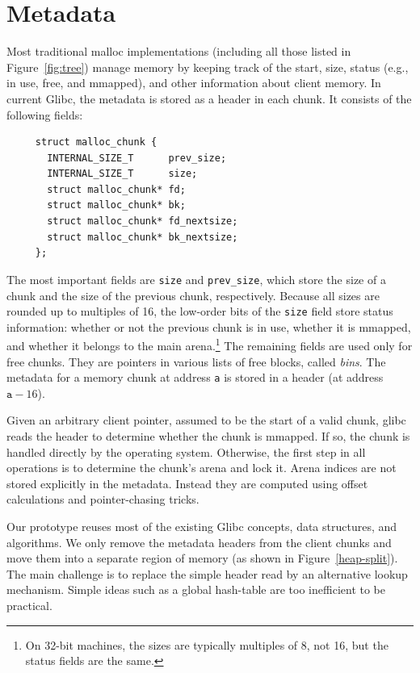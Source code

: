 \documentclass[12pt]{cslreport}
\begin{document}
\section{Metadata}

Most traditional malloc implementations (including all those listed in
Figure~\ref{fig:tree}) manage memory by keeping track of the start,
size, status (e.g., in use, free, and mmapped), and other information
about client memory. In current Glibc, the metadata is stored as a header
in each chunk. It consists of the following fields:
\begin{small}
\begin{verbatim}
     struct malloc_chunk {  
       INTERNAL_SIZE_T      prev_size; 
       INTERNAL_SIZE_T      size;
       struct malloc_chunk* fd;
       struct malloc_chunk* bk;
       struct malloc_chunk* fd_nextsize;
       struct malloc_chunk* bk_nextsize;
     };
\end{verbatim}
\end{small}
The most important fields are \texttt{size} and \texttt{prev\_size},
which store the size of a chunk and the size of the previous chunk,
respectively. Because all sizes are rounded up to multiples of 16, the
low-order bits of the \texttt{size} field store status information:
whether or not the previous chunk is in use, whether it is mmapped,
and whether it belongs to the main arena.\footnote{On 32-bit machines,
  the sizes are typically multiples of 8, not 16, but the status
  fields are the same.}  The remaining fields are used only for free
chunks. They are pointers in various lists of free blocks, called
\emph{bins}.  The metadata for a memory chunk at address \texttt{a} is
stored in a header (at address $\texttt{a} - 16$).

Given an arbitrary client pointer, assumed to be the start of a valid
chunk, glibc reads the header to determine whether the chunk is
mmapped. If so, the chunk is handled directly by the operating system.
Otherwise, the first step in all operations is to determine the
chunk's arena and lock it. Arena indices are not stored explicitly in
the metadata. Instead they are computed using offset calculations and
pointer-chasing tricks.

\bigskip

Our prototype reuses most of the existing Glibc concepts, data
structures, and algorithms. We only remove the metadata headers from
the client chunks and move them into a separate region of memory (as
shown in Figure~\ref{heap-split}). The main challenge is to replace
the simple header read by an alternative lookup mechanism. Simple
ideas such as a global hash-table are too inefficient to be practical.
\end{document}
